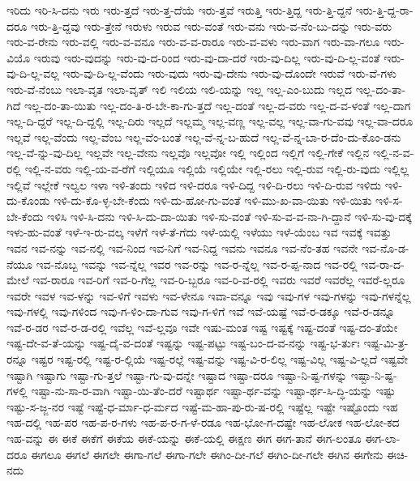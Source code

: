 {ಇರಿದು
ಇರಿ-ಸಿ-ದನು
ಇರು
ಇರು-ತ್ತದೆ
ಇರು-ತ್ತ-ದೆಯೆ
ಇರು-ತ್ತವೆ
ಇರುತ್ತಿ
ಇರು-ತ್ತಿದ್ದ
ಇರು-ತ್ತಿ-ದ್ದನೆ
ಇರು-ತ್ತಿ-ದ್ದ-ರಾ-ದರೂ
ಇರು-ತ್ತಿ-ದ್ದವು
ಇರು-ತ್ತೇನೆ
ಇರುಳು
ಇರುವ
ಇರು-ವಂತೆ
ಇರು-ವನು
ಇರು-ವ-ನೆಂ-ಬು-ದನ್ನು
ಇರು-ವರು
ಇರು-ವ-ರೇನು
ಇರು-ವಲ್ಲಿ
ಇರು-ವ-ವನೂ
ಇರು-ವ-ವ-ರಾರೂ
ಇರು-ವ-ವಳು
ಇರು-ವಾಗ
ಇರು-ವಾ-ಗಲೂ
ಇರು-ವಿಯೊ
ಇರುವು
ಇರು-ವುದನ್ನು
ಇರು-ವು-ದ-ರಿಂದ
ಇರು-ವು-ದಾ-ದರೆ
ಇರು-ವು-ದಿಲ್ಲ
ಇರು-ವು-ದಿ-ಲ್ಲ-ವಂತೆ
ಇರು-ವು-ದಿ-ಲ್ಲ-ವಲ್ಲ
ಇರು-ವು-ದಿ-ಲ್ಲ-ವೆಂದು
ಇರು-ವುದು
ಇರು-ವು-ದೇನು
ಇರು-ವು-ದೊಂದೇ
ಇರುವೆ
ಇರು-ವೆ-ಗಳು
ಇರು-ವೆ-ನೆಂಬು
ಇಲಾ-ವೃತ
ಇಲಾ-ವೃತ್
ಇಲಿ
ಇಲಿಯ
ಇಲಿ-ಯನ್ನು
ಇಲ್ಲ
ಇಲ್ಲ-ಎಂ-ಬುದು
ಇಲ್ಲದ
ಇಲ್ಲ-ದಂ-ತಾ-ಗಿದೆ
ಇಲ್ಲ-ದಂ-ತಾ-ಯಿತು
ಇಲ್ಲ-ದಂ-ತಿ-ರ-ಬೇ-ಕಾ-ಗು-ತ್ತದೆ
ಇಲ್ಲ-ದಂತೆ
ಇಲ್ಲ-ದ-ವರು
ಇಲ್ಲ-ದ-ವ-ಳಂತೆ
ಇಲ್ಲ-ದಾಗ
ಇಲ್ಲ-ದಿ-ದ್ದರೆ
ಇಲ್ಲ-ದಿ-ದ್ದಲ್ಲಿ
ಇಲ್ಲ-ದಿರು
ಇಲ್ಲದೆ
ಇಲ್ಲಮ್ಮ
ಇಲ್ಲ-ವಣ್ಣ
ಇಲ್ಲ-ವಲ್ಲ
ಇಲ್ಲ-ವಾ-ಗು-ವವು
ಇಲ್ಲ-ವಾ-ದರೂ
ಇಲ್ಲವೆ
ಇಲ್ಲ-ವೆಂದು
ಇಲ್ಲ-ವೆಂಬ
ಇಲ್ಲ-ವೆಂ-ಬಂತೆ
ಇಲ್ಲ-ವೆ-ನ್ನ-ಬ-ಹುದೆ
ಇಲ್ಲ-ವೆ-ನ್ನ-ಬಾ-ರ-ದೆಂ-ದು-ಕೊಂ-ಡನು
ಇಲ್ಲ-ವೆ-ನ್ನು-ವು-ದಿಲ್ಲ
ಇಲ್ಲವೇ
ಇಲ್ಲ-ವೇನು
ಇಲ್ಲವೊ
ಇಲ್ಲವೋ
ಇಲ್ಲಿ
ಇಲ್ಲಿಂದ
ಇಲ್ಲಿಗೆ
ಇಲ್ಲಿ-ಗೇಕೆ
ಇಲ್ಲಿನ
ಇಲ್ಲಿ-ನ-ವ-ರಲ್ಲಿ
ಇಲ್ಲಿ-ನ-ವರು
ಇಲ್ಲಿ-ಯ-ವ-ರೆಗೆ
ಇಲ್ಲಿಯೂ
ಇಲ್ಲಿಯೆ
ಇಲ್ಲಿಯೇ
ಇಲ್ಲಿ-ರಲು
ಇಲ್ಲಿ-ರುವ
ಇಲ್ಲಿ-ರು-ವುದು
ಇಲ್ಲಿಲ್ಲ
ಇಲ್ಲಿವೆ
ಇಲ್ಲೇಕೆ
ಇಲ್ವಲ
ಇಳಾ
ಇಳಿ-ತಂದು
ಇಳಿದ
ಇಳಿ-ದರೂ
ಇಳಿ-ದಿದ್ದ
ಇಳಿ-ದಿ-ರಲು
ಇಳಿ-ದಿ-ರುವ
ಇಳಿದು
ಇಳಿ-ದು-ಕೊಂಡು
ಇಳಿ-ದು-ಕೊ-ಳ್ಳ-ಬೇ-ಕೆಂದು
ಇಳಿ-ದು-ಹೋ-ಗು-ವಂತೆ
ಇಳಿ-ಮು-ಖ-ವಾ-ಯಿತು
ಇಳಿ-ಯಿತು
ಇಳಿ-ಸ-ಬೇ-ಕೆಂದು
ಇಳಿಸಿ
ಇಳಿ-ಸಿ-ದನು
ಇಳಿ-ಸಿ-ದು-ದಾ-ಯಿತು
ಇಳಿ-ಸು-ವಂತೆ
ಇಳಿ-ಸು-ವ-ವ-ನಾ-ಗಿ-ದ್ದಾನೆ
ಇಳಿ-ಸು-ವು-ದಕ್ಕೆ
ಇಳು-ಹು-ವಂತೆ
ಇಳೆ-ಇ-ರು-ವಲ್ಕ
ಇಳೆಗೆ
ಇಳೆ-ತೆ-ಗೆದು
ಇಳೆ-ಯಲ್ಲಿ
ಇಳೆಯು
ಇಳೆ-ಯೆಂಬ
ಇವ
ಇವಕ್ಕೆ
ಇವತ್ತು
ಇವನ
ಇವ-ನನ್ನು
ಇವ-ನಲ್ಲಿ
ಇವ-ನಿಂದ
ಇವ-ನಿಗೆ
ಇವ-ನಿದ್ದ
ಇವನು
ಇವನೂ
ಇವ-ನೆಂ-ತಹ
ಇವನೇ
ಇವ-ನೊ-ಡ-ನೆಯೂ
ಇವ-ನೊಬ್ಬ
ಇವನ್ನು
ಇವ-ನ್ನೆಲ್ಲ
ಇವರ
ಇವ-ರನ್ನು
ಇವ-ರ-ನ್ನೆಲ್ಲ
ಇವ-ರ-ಪ್ಪ-ನಾದ
ಇವ-ರಲ್ಲಿ
ಇವ-ರಾ-ದ-ಮೇಲೆ
ಇವ-ರಾರೂ
ಇವ-ರಿಗೆ
ಇವ-ರಿ-ಗೆಲ್ಲ
ಇವ-ರಿ-ಬ್ಬರೂ
ಇವ-ರಿ-ವ-ರಲ್ಲಿ
ಇವರು
ಇವರೆ
ಇವರೆಲ್ಲ
ಇವರೆ-ಲ್ಲರೂ
ಇವರೇ
ಇವಳ
ಇವ-ಳನ್ನು
ಇವ-ಳಿಗೆ
ಇವಳು
ಇವ-ಳೇನೂ
ಇವಾ-ವನ್ನೂ
ಇವು
ಇವು-ಗಳ
ಇವು-ಗಳನ್ನು
ಇವು-ಗಳನ್ನೆಲ್ಲ
ಇವು-ಗಳಲ್ಲಿ
ಇವು-ಗಳಿಂದ
ಇವು-ಗ-ಳಿಂ-ದಾ-ಗುವ
ಇವು-ಗ-ಳಿಗೆ
ಇವೆ
ಇವೆ-ಯಷ್ಟೆ
ಇವೆ-ರ-ಡಕ್ಕೂ
ಇವೆ-ರ-ಡನ್ನೂ
ಇವೆ-ರ-ಡರ
ಇವೆ-ರ-ಡ-ರಲ್ಲಿ
ಇವೆಲ್ಲ
ಇವೆ-ಲ್ಲವೂ
ಇವೇ
ಇಷು-ಮಂತ
ಇಷ್ಟ
ಇಷ್ಟಕ್ಕೆ
ಇಷ್ಟ-ದಂತೆ
ಇಷ್ಟ-ದಂ-ತೆಯೇ
ಇಷ್ಟ-ದೇ-ವ-ತೆ-ಯನ್ನು
ಇಷ್ಟ-ದೈ-ವ-ದಂತೆ
ಇಷ್ಟನ್ನು
ಇಷ್ಟ-ಪಟ್ಟು
ಇಷ್ಟ-ಬಂ-ದ-ವ-ನನ್ನು
ಇಷ್ಟ-ಭ-ರ್ತುಃ
ಇಷ್ಟ-ಮಿ-ತ್ರ-ರನ್ನೂ
ಇಷ್ಟರ
ಇಷ್ಟ-ರಲ್ಲಿ
ಇಷ್ಟ-ರ-ಲ್ಲಿಯೆ
ಇಷ್ಟ-ರಲ್ಲೆ
ಇಷ್ಟ-ವನ್ನು
ಇಷ್ಟ-ವಿ-ರ-ಲಿಲ್ಲ
ಇಷ್ಟ-ವಿಲ್ಲ
ಇಷ್ಟ-ವಿ-ಲ್ಲದೆ
ಇಷ್ಟವೇ
ಇಷ್ಟಾಗಿ
ಇಷ್ಟಾಗು
ಇಷ್ಟಾ-ಗು-ತ್ತಲೆ
ಇಷ್ಟಾ-ಗು-ವು-ದನ್ನೇ
ಇಷ್ಟಾದ
ಇಷ್ಟಾ-ದರೂ
ಇಷ್ಟಾ-ನಿ-ಷ್ಟ-ಗಳನ್ನು
ಇಷ್ಟಾ-ನಿ-ಷ್ಟ-ಗಳಲ್ಲಿ
ಇಷ್ಟಾ-ನು-ಸಾ-ರ-ವಾಗಿ
ಇಷ್ಟಾ-ಯಿ-ತೆಂ-ದರೆ
ಇಷ್ಟಾರ್ಥ
ಇಷ್ಟಾ-ರ್ಥ-ವನ್ನು
ಇಷ್ಟಾ-ರ್ಥ-ಸಿ-ದ್ಧಿ-ಯನ್ನು
ಇಷ್ಟು
ಇಷ್ಟು-ಸ-ಜ್ಜ-ನರ
ಇಷ್ಟೆ
ಇಷ್ಟೆ-ಧ-ರ್ಮಾ-ಧ-ರ್ಮದ
ಇಷ್ಟೆ-ಮ-ಹಾ-ಪು-ರು-ಷ-ರಲ್ಲಿ
ಇಷ್ಟೆಲ್ಲ
ಇಷ್ಟೇ
ಇಷ್ಟೊಂದು
ಇಹ
ಇಹ-ದಲ್ಲಿ
ಇಹ-ಪರ
ಇಹ-ಪ-ರ-ಗಳು
ಇಹ-ಪ-ರ-ಗ-ಳೆ-ರಡೂ
ಇಹ-ಭೋ-ಗ-ದಷ್ಟೇ
ಇಹ-ಲೋಕ
ಇಹ-ಲೋ-ಕದ
ಇಹ-ವನ್ನು
ಈ
ಈಕೆ
ಈಕೆಗೆ
ಈಕೆಯ
ಈಕೆ-ಯನ್ನು
ಈಕೆ-ಯಲ್ಲಿ
ಈಕ್ಷಣ
ಈಗ
ಈಗ-ತಾನೆ
ಈಗ-ಲಂತೂ
ಈಗ-ಲಾ-ದರೂ
ಈಗಲೂ
ಈಗಲೆ
ಈಗಲೇ
ಈಗಾ-ಗಲೆ
ಈಗಾ-ಗಲೇ
ಈಗಿಂ-ದೀ-ಗಲೆ
ಈಗಿಂ-ದೀ-ಗಲೇ
ಈಗಿನ
ಈಗೇನು
ಈಚಿ-ನದು
}
